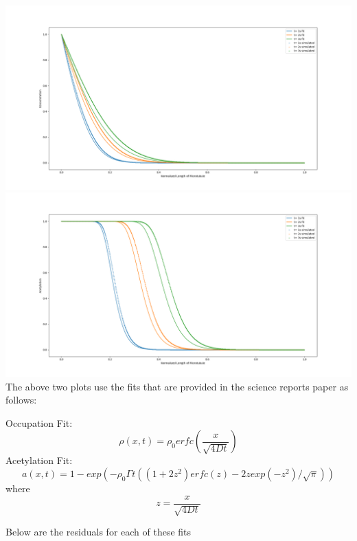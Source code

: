 \documentclass[]{article}
\title{}
\author{}
\begin{document}
\includegraphics[width=\textwidth]{OccupationFitsWithSteadyStateMultiplication}
\includegraphics[width=\textwidth]{AcetylationFitsWithSteadyStateMultiplication}
The above two plots use the fits that are provided in the science reports paper as follows:

Occupation Fit:
\begin{equation}
\rho (x,t) = \rho_0 erfc(\frac{x}{\sqrt{4Dt}})
\end{equation}
Acetylation Fit:
\begin{equation}
a(x,t) = 1-exp(-\rho_0\Gamma t ( (1+2z^2)erfc(z) - 2z exp(-z^2)/\sqrt{\pi}))
\end{equation}
where $$ z = \frac{x}{\sqrt{4Dt}} $$

Below are the residuals for each of these fits
\end{document}
